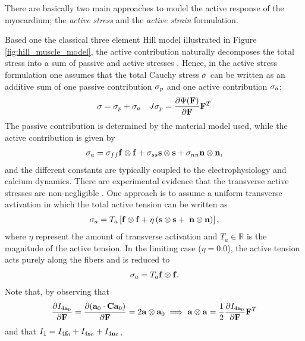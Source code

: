 There are basically two main approaches to model the active response
of the myocardium; the \emph{active stress} and the \emph{active strain}
formulation.


Based one the classical three element Hill model illustrated in Figure
\ref{fig:hill_muscle_model}, the active contribution naturally
decomposes the total stress into a sum of passive and active stresses
\cite{nash2004electromechanical}. Hence, in the active stress
formulation \cite{hunter1998modelling} one assumes that the total
Cauchy stress $\mathbf{\sigma}$ can be written as an additive sum of one
passive contribution $\mathbf{\sigma}_p$ and one active contribution 
$\mathbf{\sigma}_a$;
\begin{align}
  \mathbf{\sigma} = \mathbf{\sigma}_p + \mathbf{\sigma}_a && J \mathbf{\sigma}_p =  \frac{\partial \Psi(\mathbf{F})}{\partial \mathbf{F}} \mathbf{F}^{T}
\end{align}
The passive contribution is determined by the material model used,
while the active contribution is given by 
\begin{align}
  \mathbf{\sigma}_a = \mathbf{\sigma}_{ff} \mathbf{f} \otimes \mathbf{f} +
  \mathbf{\sigma}_{ss} \mathbf{s} \otimes \mathbf{s} +
  \mathbf{\sigma}_{nn} \mathbf{n} \otimes \mathbf{n},
\end{align}
and the different constants are typically coupled to the
electrophysiology and calcium dynamics.
There are experimental evidence that the transverse active stresses
are non-negligible \cite{lin1998multiaxial}. One approach is to assume
a uniform transverse avtivation in which the total active tension
can be written as 
\begin{align}
  \mathbf{\sigma}_a = T_a \left[\mathbf{f} \otimes \mathbf{f} +
   \eta\left( \mathbf{s} \otimes \mathbf{s} +
  \ \mathbf{n} \otimes \mathbf{n} \right)\right],
\end{align}
where $\eta$ represent the amount of transverse activation and $T_a
\in \mathbb{R}$ is the magnitude of the active tension.
In the limiting case ($\eta = 0.0$), the active tension acts purely
along the fibers and is reduced to 
\begin{align}
  \mathbf{\sigma}_a = T_a \mathbf{f} \otimes \mathbf{f}.
\end{align}
Note that, by observing  that
\begin{align*}
  \frac{\partial I_{4\mathbf{a}_0}}{\partial \mathbf{F}} = \frac{\partial (\mathbf{a}_0  \cdot \mathbf{C} \mathbf{a}_0 )}{\partial \mathbf{F}}
  = 2 \mathbf{a} \otimes \mathbf{a}_0 \implies  \mathbf{a} \otimes  \mathbf{a}= \frac{1}{2} \frac{\partial I_{4\mathbf{a}_0}}{\partial \mathbf{F}} \mathbf{F}^{T}
\end{align*}
and that $I_1 =  I_{4\mathbf{f}_0} +  I_{4\mathbf{s}_0} +  I_{4\mathbf{n}_0}$, 
